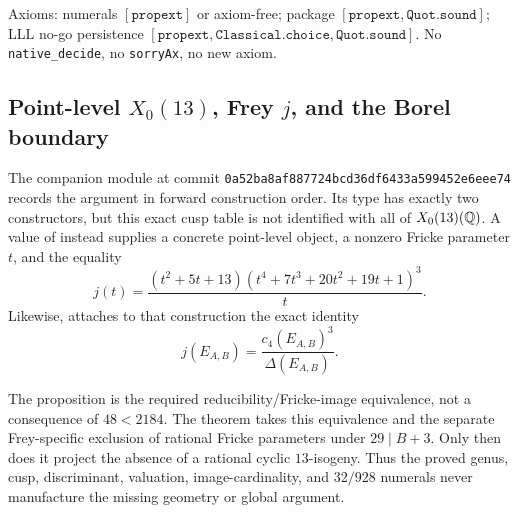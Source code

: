 Axioms: numerals $[\mathtt{propext}]$ or axiom-free;
package $[\mathtt{propext},\mathtt{Quot.sound}]$;
LLL no-go persistence
$[\mathtt{propext},\mathtt{Classical.choice},\mathtt{Quot.sound}]$.
No \texttt{native\_decide}, no \texttt{sorryAx}, no new axiom.

\subsection{Point-level $X_0(13)$, Frey $j$, and the Borel boundary}

The companion module  at commit
\texttt{0a52ba8af887724bcd36df6433a599452e6eee74} records the argument in
forward construction order. Its type  has exactly two
constructors, but this exact cusp table is not identified with all of
$X_0(13)(\mathbb{Q})$. A value of  instead supplies a
concrete point-level object, a nonzero Fricke parameter $t$, and the equality
\[
 j(t)=
 \frac{(t^2+5t+13)(t^4+7t^3+20t^2+19t+1)^3}{t}.
\]
Likewise,  attaches to that construction the exact
identity
\[
 j(E_{A,B})=\frac{c_4(E_{A,B})^3}{\Delta(E_{A,B})}.
\]

The proposition  is the required
reducibility/Fricke-image equivalence, not a consequence of
$48<2184$. The theorem
 takes this equivalence and the
separate Frey-specific exclusion of rational Fricke parameters under
$29\mid B+3$. Only then does it project the absence of a rational cyclic
$13$-isogeny. Thus the proved genus, cusp, discriminant, valuation,
image-cardinality, and $32/928$ numerals never manufacture the missing
geometry or global argument.
